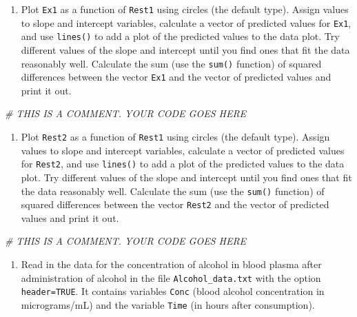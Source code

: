 \documentclass[
]{book}
\newenvironment{Shaded}{\begin{snugshade}}{\end{snugshade}}
\newcommand{\CommentTok}[1]{\textcolor[rgb]{0.56,0.35,0.01}{\textit{#1}}}
\providecommand{\tightlist}{%
  \setlength{\itemsep}{0pt}\setlength{\parskip}{0pt}}
\theoremstyle{definition}
\theoremstyle{definition}
\theoremstyle{definition}
\theoremstyle{remark}
\begin{document}
\begin{enumerate}
\def\labelenumi{\alph{enumi})}
\setcounter{enumi}{1}
\tightlist
\item
  Plot \texttt{Ex1} as a function of \texttt{Rest1} using circles (the default type). Assign values to slope and intercept variables, calculate a vector of predicted values for \texttt{Ex1}, and use \texttt{lines()} to add a plot of the predicted values to the data plot. Try different values of the slope and intercept until you find ones that fit the data reasonably well. Calculate the sum (use the \texttt{sum()} function) of squared differences between the vector \texttt{Ex1} and the vector of predicted values and print it out.
\end{enumerate}

\begin{Shaded}
\begin{Highlighting}[]
\CommentTok{\# THIS IS A COMMENT. YOUR CODE GOES HERE }
\end{Highlighting}
\end{Shaded}

\begin{enumerate}
\def\labelenumi{\alph{enumi})}
\setcounter{enumi}{2}
\tightlist
\item
  Plot \texttt{Rest2} as a function of \texttt{Rest1} using circles (the default type). Assign values to slope and intercept variables, calculate a vector of predicted values for \texttt{Rest2}, and use \texttt{lines()} to add a plot of the predicted values to the data plot. Try different values of the slope and intercept until you find ones that fit the data reasonably well. Calculate the sum (use the \texttt{sum()} function) of squared differences between the vector \texttt{Rest2} and the vector of predicted values and print it out.
\end{enumerate}

\begin{Shaded}
\begin{Highlighting}[]
\CommentTok{\# THIS IS A COMMENT. YOUR CODE GOES HERE }
\end{Highlighting}
\end{Shaded}

\begin{enumerate}
\def\labelenumi{\arabic{enumi}.}
\setcounter{enumi}{2}
\tightlist
\item
  Read in the data for the concentration of alcohol in blood plasma after administration of alcohol in the file \texttt{Alcohol\_data.txt} with the option \texttt{header=TRUE}. It contains variables \texttt{Conc} (blood alcohol concentration in micrograms/mL) and the variable \texttt{Time} (in hours after consumption).
\end{enumerate}
\end{document}
